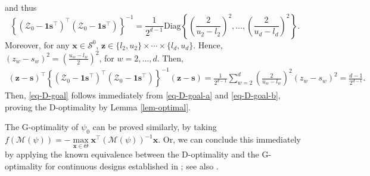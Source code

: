 \documentclass[ijoc,nonblindrev]{informs3}
\def\bx{{\bm x}}
\def\cZ{{\mathcal Z}}
\def\cS{{\mathcal{S}}}
\def\bz{{\bm z}}
\def\bs{{\bm s}}
\def\bone{{\bm 1}}
\def\cM{{\mathcal M}}
\begin{document}
and thus
$$ \left\{ \left(\cZ_0 - \bone \bs^\intercal\right)^\intercal \left(\cZ_0 - \bone \bs^\intercal\right) \right\}^{-1} = \frac{1}{2^{d-1}} \mathrm{Diag}\left\{ \left(\frac{2}{u_2-l_2}\right)^2, \ldots, \left(\frac{2}{u_d-l_d}\right)^2 \right\}.$$
Moreover, for any $\bx \in \cS^0$, $\bz\in \{l_2,u_2\} \times \cdots \times \{l_d,u_d\}$.
Hence, $(z_w-s_w)^2 = \left(\frac{u_w-l_w}{2}\right)^2$, for $w=2,\ldots,d$.
Then,
\begin{align} \label{eq-D-goal-b}
\left( \bz - \bs \right)^\intercal \left\{ \left(\cZ_0 - \bone \bs^\intercal\right)^\intercal \left(\cZ_0 - \bone \bs^\intercal\right) \right\}^{-1} \left( \bz - \bs \right)
= \frac{1}{2^{d-1}} \sum_{w=2}^d \left(\frac{2}{u_w-l_w}\right)^2 (z_w-s_w)^2 = \frac{d-1}{2^{d-1}}.
\end{align}
Then, \eqref{eq-D-goal}  follows immediately from \eqref{eq-D-goal-a} and \eqref{eq-D-goal-b}, proving the D-optimality by Lemma \ref{lem-optimal}.

The G-optimality of $\psi_0$ can be proved similarly, by taking $f(\cM(\psi)) = - \max\limits_{\bx \in \Theta} \bx^\intercal (\cM(\psi))^{-1} \bx $.
Or, we can conclude this immediately by applying the known equivalence between the D-optimality and the G-optimality for continuous designs established in \citet{kiefer1960equivalence_ec}; see also \citet[\S 3.11]{silvey1980optimal_ec}.
\Halmos
\endproof
\end{document}
